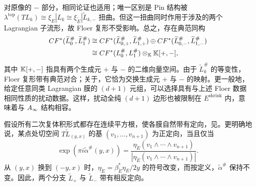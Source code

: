 对原像的 $-$ 部分，相同论证也适用；唯一区别是 Pin 结构被 $\lambda^{\mathrm{top}}(TL_k)\cong\xi_E|L_k\cong\xi_{\widetilde E}|\widetilde L_{k,-}$ 扭曲。但这一扭曲同时作用于涉及的两个 Lagrangian 子流形，故 Floer 复形不受影响。总之，存在典范同构
\begin{equation}\label{eq:18.20}
\begin{aligned}
CF^*(\widetilde L_0^\#,\widetilde L_1^\#)
&\cong CF^*(\widetilde L_{0,+}^\#,\widetilde L_{1,+}^\#)\oplus CF^*(\widetilde L_{0,-}^\#,\widetilde L_{1,-}^\#)\\
&\cong CF^*(L_0^\#,L_1^\#)\otimes_{\mathbb K}\mathbb K[+,-],
\end{aligned}
\end{equation}
其中 $\mathbb K[+,-]$ 指具有两个生成元 $+$ 与 $-$ 的二维向量空间。由于 $\widetilde L_k^\#$ 的等变性，Floer 复形带有典范对合；关于，它恰为交换生成元 $+$ 与 $-$ 的映射。更一般地，给定任意同类 Lagrangian 膜的 $(d+1)$ 元组，可以选择具有与上述 Floer 数据相同性质的扰动数据。这样，扰动全纯 $(d+1)$ 边形也被限制在 $E^{\mathrm{shrink}}$ 内，意味着与 $A_\infty$ 结构相容。
\begin{note}\label{st:18.8}
假设所有二次复体积形式都存在连续平方根，使各膜自然带有定向，见。更明确地说，某点处切空间 $T\widetilde L_{(y,x)}$ 的基 $(v_1,\ldots,v_{n+1})$ 为正定向，当且仅当
\[
\exp(\pi i\widetilde\alpha^\#(y,x))=
\frac{\eta_{\widetilde E}(v_1\wedge\cdots\wedge v_{n+1})}{|\eta_{\widetilde E}(v_1\wedge\cdots\wedge v_{n+1})|}.
\]
从 $(y,x)$ 换到 $(-y,x)$ 时，$\eta_{\widetilde E}=\beta_{\widetilde E}^*\eta_E/2y$ 的符号改变，而按定义，$\widetilde\alpha^\#$ 保持不变。因此，两个分支 $\widetilde L_+$ 与 $\widetilde L_-$ 带有相反定向。
\end{note}
